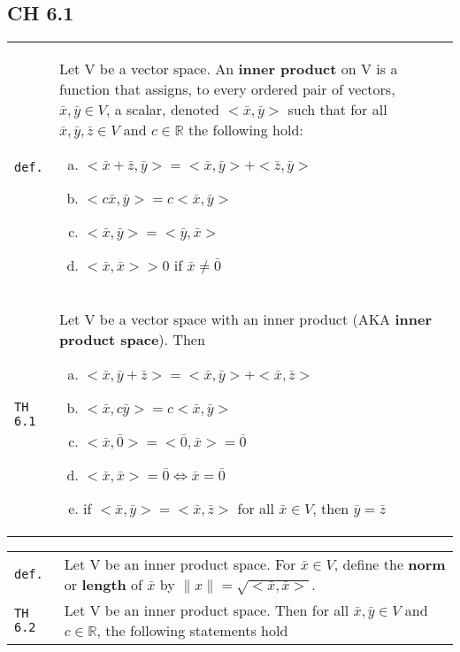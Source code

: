 \documentclass[10pt,landscape]{article}
\begin{document}
\begin{multicols}{3}
\section{CH 6.1}
\begin{tabular}{@{}p{\the\MyLen}%
                @{}p{\linewidth-\the\MyLen}@{}} %
\verb!def.! & Let V be a vector space. An \textbf{inner product} on V is a function that assigns, to every ordered pair of vectors, $\bar{x},\bar{y}\in V$, a scalar, denoted $<\bar{x},
             \bar{y}>$ such that for all $\bar{x},\bar{y},\bar{z}\in V$ and $c\in\mathbb{R}$ the following hold:
             \begin{enumerate}[a)]
               \item $<\bar x + \bar z,\bar y> = <\bar x,\bar y> + <\bar z, \bar y>$
               \item $<c\bar x,\bar y> = c<\bar x,\bar y>$
               \item $<\bar x,\bar y> = <\bar y,\bar x>$
               \item $<\bar x, \bar x> > 0$ if $\bar x \neq \bar 0$
             \end{enumerate}\\
\verb!TH 6.1! & Let V be a vector space with an inner product (AKA \textbf{inner product space}). Then
               \begin{enumerate}[a)]
                 \item $<\bar x,\bar y + \bar z> = <\bar x,\bar y> + <\bar x,\bar z>$
                 \item $<\bar x,c\bar y> = c<\bar x,\bar y>$
                 \item $<\bar x,\bar 0> = <\bar 0,\bar x> = \bar 0$
                 \item $<\bar x,\bar x> = \bar 0\Longleftrightarrow\bar x = \bar 0$
                 \item if $<\bar x,\bar y> = <\bar x,\bar z>$ for all $\bar x\in V$, then $\bar y = \bar z$
              \end{enumerate}\\
\end{tabular}
\begin{tabular}{@{}p{\the\MyLen}%
                @{}p{\linewidth-\the\MyLen}@{}} %
\verb!def.! & Let V be an inner product space. For $\bar x\in V$, define the \textbf{norm} or \textbf{length} of $\bar x$ by $\| x\| = \sqrt{<\bar x,\bar x>}$.\\
\verb!TH 6.2! & Let V be an inner product space. Then for all $\bar x,\bar y\in V$ and $c\in\mathbb{R}$, the following statements hold

\end{tabular}
\end{multicols}
\end{document}
